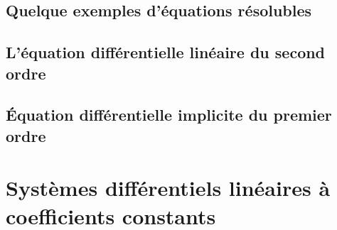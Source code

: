 
					\subsection{Quelque exemples d'équations résolubles}


					\subsection{L'équation différentielle linéaire du second ordre}


					\subsection{Équation différentielle implicite du premier ordre}


					\section{Systèmes différentiels linéaires à coefficients constants}



